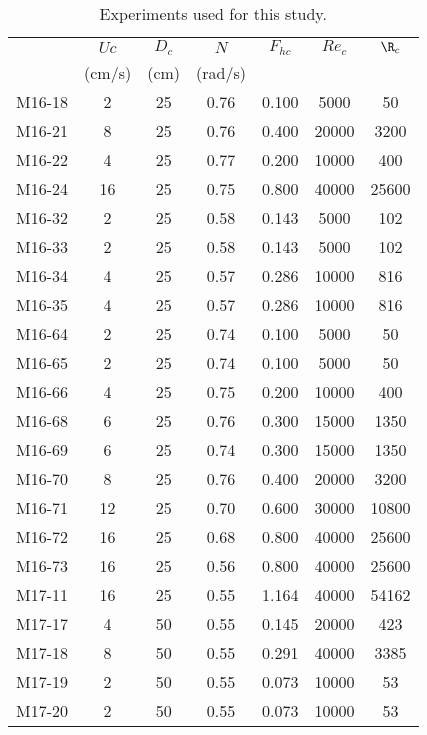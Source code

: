 
\begin{table}
\caption{\label{table:exp} Experiments used for this study.}
\begin{ruledtabular}
\begin{tabular}{lcccccc}
    &   $Uc$ &  $D_c$ &  $N$  &  $F_{hc}$ &  $Re_c$ &   $\R_c$  \\
    & (cm/s) &   (cm) &(rad/s)&           &         &           \\

 M16-18 &   2 &  25 &  0.76 &  0.100 &   5000 &     50 \\
 M16-21 &   8 &  25 &  0.76 &  0.400 &  20000 &   3200 \\
 M16-22 &   4 &  25 &  0.77 &  0.200 &  10000 &    400 \\
 M16-24 &  16 &  25 &  0.75 &  0.800 &  40000 &  25600 \\
 M16-32 &   2 &  25 &  0.58 &  0.143 &   5000 &    102 \\
 M16-33 &   2 &  25 &  0.58 &  0.143 &   5000 &    102 \\
 M16-34 &   4 &  25 &  0.57 &  0.286 &  10000 &    816 \\
 M16-35 &   4 &  25 &  0.57 &  0.286 &  10000 &    816 \\
 M16-64 &   2 &  25 &  0.74 &  0.100 &   5000 &     50 \\
 M16-65 &   2 &  25 &  0.74 &  0.100 &   5000 &     50 \\
 M16-66 &   4 &  25 &  0.75 &  0.200 &  10000 &    400 \\
 M16-68 &   6 &  25 &  0.76 &  0.300 &  15000 &   1350 \\
 M16-69 &   6 &  25 &  0.74 &  0.300 &  15000 &   1350 \\
 M16-70 &   8 &  25 &  0.76 &  0.400 &  20000 &   3200 \\
 M16-71 &  12 &  25 &  0.70 &  0.600 &  30000 &  10800 \\
 M16-72 &  16 &  25 &  0.68 &  0.800 &  40000 &  25600 \\
 M16-73 &  16 &  25 &  0.56 &  0.800 &  40000 &  25600 \\
 M17-11 &  16 &  25 &  0.55 &  1.164 &  40000 &  54162 \\
 M17-17 &   4 &  50 &  0.55 &  0.145 &  20000 &    423 \\
 M17-18 &   8 &  50 &  0.55 &  0.291 &  40000 &   3385 \\
 M17-19 &   2 &  50 &  0.55 &  0.073 &  10000 &     53 \\
 M17-20 &   2 &  50 &  0.55 &  0.073 &  10000 &     53 \\

\end{tabular}
\end{ruledtabular}
\end{table}
